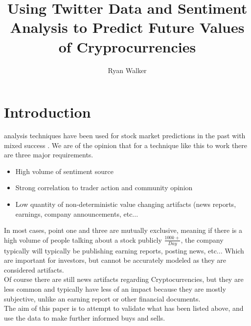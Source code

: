 \documentclass[12pt,journal,compsoc]{IEEEtran}
\begin{document}
\title{Using Twitter Data and Sentiment Analysis to Predict Future Values of Cryprocurrencies}

\author{Ryan Walker}


\maketitle
\IEEEpeerreviewmaketitle

\section{Introduction}
 analysis techniques have been used for stock market predictions in the past  with 
mixed success \cite{BI1}. We are of the opinion that for a technique like this to work there are three major requirements.

\begin{itemize}
\item High volume of sentiment source
\item Strong correlation to trader action and community opinion
\item Low quantity of non-deterministic value changing artifacts (news reports, earnings, company announcements, etc...
\end{itemize}

In most cases, point one and three are mutually exclusive, meaning if there is a high volume of people talking about a
stock publicly $\frac{100k+}{Day}$, the company typically will typically be publishing earning reports, posting news, etc... 
Which are important for investors, but cannot be accurately modeled as they are considered artifacts.\\

Of course there are still news artifacts regarding Cryptocurrencies, but they are less common and typically 
have less of an impact because they are mostly subjective, unlike an earning report or other financial documents.\\

The aim of this paper is to attempt to validate what has been listed above, and use the data to make further informed 
buys and sells.
\end{document}
